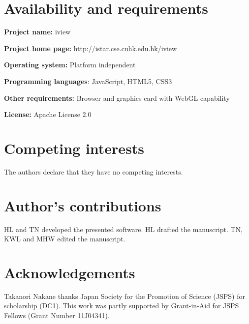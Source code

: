 \documentclass[twocolumn]{bmcart}%
\begin{document}
\begin{backmatter}

\section*{Availability and requirements}
\textbf{Project name:} iview

\textbf{Project home page:} http://istar.cse.cuhk.edu.hk/iview

\textbf{Operating system:} Platform independent

\textbf{Programming languages}: JavaScript, HTML5, CSS3

\textbf{Other requirements:} Browser and graphics card with WebGL capability

\textbf{License:} Apache License 2.0


\section*{Competing interests}
The authors declare that they have no competing interests.

\section*{Author's contributions}
HL and TN developed the presented software. HL drafted the manuscript. TN, KWL and MHW edited the manuscript.%

\section*{Acknowledgements}
Takanori Nakane thanks Japan Society for the Promotion of Science (JSPS) for scholarship (DC1). This work was partly supported by Grant-in-Aid for JSPS Fellows (Grant Number 11J04341).



\end{backmatter}
\end{document}
